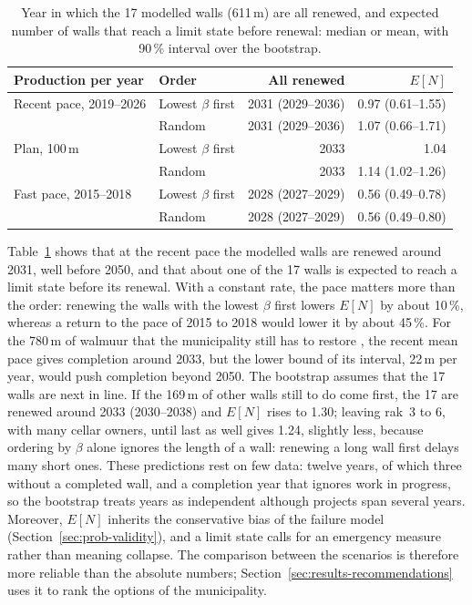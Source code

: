 \begin{table}[htbp]
\centering
\small
\caption{Year in which the 17 modelled walls (611\,m) are all renewed, and
expected number of walls that reach a limit state before renewal: median or
mean, with 90\,\% interval over the bootstrap.}
\label{tab:backlog}
\begin{tabular}{@{}l l r r@{}}
\toprule
Production per year & Order & All renewed & $E[N]$ \\
\midrule
Recent pace, 2019--2026 & Lowest $\beta$ first & 2031 (2029--2036) & 0.97 (0.61--1.55) \\
 & Random & 2031 (2029--2036) & 1.07 (0.66--1.71) \\
Plan, 100\,m & Lowest $\beta$ first & 2033 & 1.04 \\
 & Random & 2033 & 1.14 (1.02--1.26) \\
Fast pace, 2015--2018 & Lowest $\beta$ first & 2028 (2027--2029) & 0.56 (0.49--0.78) \\
 & Random & 2028 (2027--2029) & 0.56 (0.49--0.80) \\
\bottomrule
\end{tabular}
\end{table}

Table~\ref{tab:backlog} shows that at the recent pace the modelled walls are
renewed around 2031, well before 2050, and that about one of the 17 walls is
expected to reach a limit state before its renewal. With a constant rate, the
pace matters more than the order: renewing the walls with the lowest $\beta$ first lowers $E[N]$
by about 10\,\%, whereas a return to the pace of 2015 to 2018 would lower it by
about 45\,\%. For the 780\,m of walmuur that the municipality still has to
restore \parencite{gu2025up}, the recent mean pace gives completion around
2033, but the lower bound of its interval, 22\,m per year, would push
completion beyond 2050. The bootstrap assumes that the 17 walls are next in
line. If the 169\,m of other walls still to do come first, the 17 are renewed
around 2033 (2030--2038) and $E[N]$ rises to 1.30; leaving rak~3 to 6, with many
cellar owners, until last as well gives 1.24, slightly less, because ordering
by $\beta$ alone ignores the length of a wall: renewing a long wall first delays
many short ones. These predictions rest on few data: twelve years,
of which three without a completed wall, and a completion year that ignores
work in progress, so the bootstrap treats years as independent although
projects span several years. Moreover, $E[N]$ inherits the conservative bias of
the failure model (Section~\ref{sec:prob-validity}), and a limit state calls
for an emergency measure rather than meaning collapse. The comparison between
the scenarios is therefore more reliable than the absolute numbers;
Section~\ref{sec:results-recommendations} uses it to rank the options of the
municipality.

